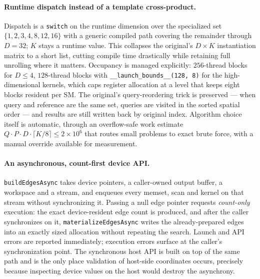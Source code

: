 \documentclass[11pt]{article}
\begin{document}
\paragraph{Runtime dispatch instead of a template cross-product.}
Dispatch is a \texttt{switch} on the runtime dimension over the specialized set
$\{1,2,3,4,8,12,16\}$ with a generic compiled path covering the remainder through
$D = 32$; $K$ stays a runtime value. This collapses the original's $D \times K$
instantiation matrix to a short list, cutting compile time drastically while
retaining full unrolling where it matters. Occupancy is managed explicitly:
$256$-thread blocks for $D \le 4$, $128$-thread blocks with
\texttt{\_\_launch\_bounds\_\_(128, 8)} for the high-dimensional kernels, which
caps register allocation at a level that keeps eight blocks resident per SM. The
original's query-reordering trick is preserved --- when query and reference are
the same set, queries are visited in the sorted spatial order --- and results are
still written back by original index. Algorithm choice itself is automatic,
through an overflow-safe work estimate
$Q \cdot P \cdot D \cdot \lceil K/8 \rceil \le 2\times10^6$ that routes small
problems to exact brute force, with a manual override available for measurement.

\paragraph{An asynchronous, count-first device API.}
\texttt{buildEdgesAsync} takes device pointers, a caller-owned output buffer, a
workspace and a stream, and enqueues every memset, scan and kernel on that
stream without synchronizing it. Passing a null edge pointer requests
\emph{count-only} execution: the exact device-resident edge count is produced,
and after the caller synchronizes on it, \texttt{materializeEdgesAsync} writes
the already-prepared edges into an exactly sized allocation without repeating
the search. Launch and API errors are reported immediately; execution errors
surface at the caller's synchronization point. The synchronous host API is built
on top of the same path and is the only place validation of host-side
coordinates occurs, precisely because inspecting device values on the host would
destroy the asynchrony.
\end{document}
